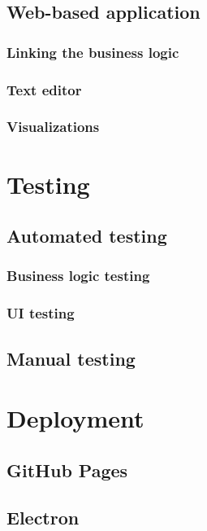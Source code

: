 \documentclass[english,engineering]{wizthesis}
\begin{document}
\section{Web-based application}

\subsection{Linking the business logic}

\subsection{Text editor}

\subsection{Visualizations}

\chapter{Testing}

\section{Automated testing}

\subsection{Business logic testing}

\subsection{UI testing}

\section{Manual testing}

\chapter{Deployment}

\section{GitHub Pages}

\section{Electron}
\end{document}
